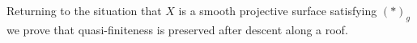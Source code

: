 \documentclass[main.tex]{subfiles}
\begin{document}

Returning to the situation that $X$ is a smooth projective surface satisfying $(\ast)_g$ we prove that quasi-finiteness is preserved after descent along a roof.
\end{document}
